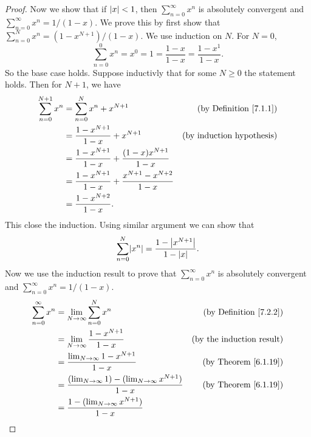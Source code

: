 \begin{proof}
    Now we show that if \(\abs*{x} < 1\), then \(\sum_{n = 0}^\infty x^n\) is absolutely convergent and \(\sum_{n = 0}^\infty x^n = 1 / (1 - x)\).
    We prove this by first show that \(\sum_{n = 0}^N x^n = (1 - x^{N + 1}) / (1 - x)\).
    We use induction on \(N\).
    For \(N = 0\),
    \[
        \sum_{n = 0}^0 x^n = x^0 = 1 = \frac{1 - x}{1 - x} = \frac{1 - x^1}{1 - x}.
    \]
    So the base case holds.
    Suppose inductivly that for some \(N \geq 0\) the statement holds.
    Then for \(N + 1\), we have
    \begin{align*}
        \sum_{n = 0}^{N + 1} x^n & = \sum_{n = 0}^N x^n + x^{N + 1}                                    & \text{(by Definition \ref{7.1.1})} \\
                                 & = \frac{1 - x^{N + 1}}{1 - x} + x^{N + 1}                           & \text{(by induction hypothesis)}   \\
                                 & = \frac{1 - x^{N + 1}}{1 - x} + \frac{(1 - x) x^{N + 1}}{1 - x}                                          \\
                                 & = \frac{1 - x^{N + 1}}{1 - x} + \frac{x^{N + 1} - x^{N + 2}}{1 - x}                                      \\
                                 & = \frac{1 - x^{N + 2}}{1 - x}.
    \end{align*}
    This close the induction.
    Using similar argument we can show that
    \[
        \sum_{n = 0}^N \abs*{x^n} = \frac{1 - \abs*{x^{N + 1}}}{1 - \abs*{x}}.
    \]
    Now we use the induction result to prove that \(\sum_{n = 0}^\infty x^n\) is absolutely convergent and \(\sum_{n = 0}^\infty x^n = 1 / (1 - x)\).
    \begin{align*}
        \sum_{n = 0}^\infty x^n & = \lim_{N \to \infty} \sum_{n = 0}^N x^n                                  & \text{(by Definition \ref{7.2.2})} \\
                                & = \lim_{N \to \infty} \frac{1 - x^{N + 1}}{1 - x}                         & \text{(by the induction result)}   \\
                                & = \frac{\lim_{N \to \infty} 1 - x^{N + 1}}{1 - x}                         & \text{(by Theorem \ref{6.1.19})}   \\
                                & = \frac{(\lim_{N \to \infty} 1) - (\lim_{N \to \infty} x^{N + 1})}{1 - x} & \text{(by Theorem \ref{6.1.19})}   \\
                                & = \frac{1 - (\lim_{N \to \infty} x^{N + 1})}{1 - x}                                                            \\

\end{align*}
\end{proof}
